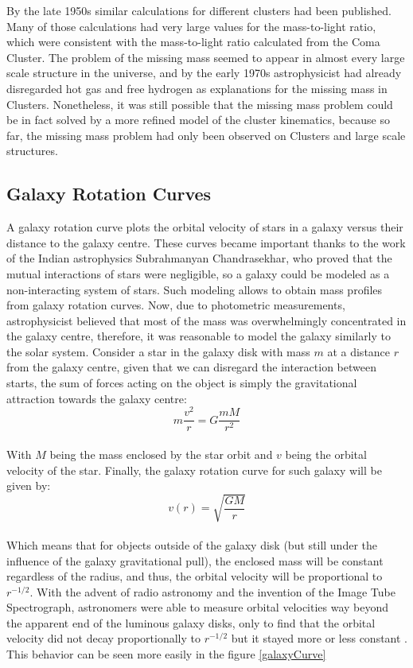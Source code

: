 By the late 1950s similar calculations for different clusters had been published. Many of those calculations had very large values for the mass-to-light ratio\cite{schwarzschildSon}, which were consistent with the mass-to-light ratio calculated from the Coma Cluster. The problem of the missing mass seemed to appear in almost every large scale structure in the universe, and by the early 1970s astrophysicist had already disregarded hot gas\cite{meekins} and free hydrogen\cite{penzias} as explanations for the missing mass in Clusters. Nonetheless, it was still possible that the missing mass problem could be in fact solved by a more refined model of the cluster kinematics, because so far, the missing mass problem had only been observed on Clusters and large scale structures.

\subsection{Galaxy Rotation Curves}
A galaxy rotation curve plots the orbital velocity of stars in a galaxy versus their distance to the galaxy centre. These curves became important thanks to the work of the Indian astrophysics Subrahmanyan Chandrasekhar, who proved that the mutual interactions of stars were negligible, so a galaxy could be modeled as a non-interacting system of stars. Such modeling allows to obtain mass profiles from galaxy rotation curves. Now, due to photometric measurements, astrophysicist believed that most of the mass was overwhelmingly concentrated  in the galaxy centre, therefore, it was reasonable to model the galaxy similarly to the solar system. Consider a star in the galaxy disk with mass $m$ at a distance $r$ from the galaxy centre, given that we can disregard the interaction between starts, the sum of forces acting on the object is simply the gravitational attraction towards the galaxy centre:\\
\begin{equation}
m\frac{v^2}{r} = G \frac{mM}{r^2}
\end{equation}\\
With $M$ being the mass enclosed by the star orbit and $v$ being the orbital velocity of the star. Finally, the galaxy rotation curve for such galaxy will be given by:\\
\begin{equation}
v(r) = \sqrt{\frac{GM}{r}}
\end{equation}\\
Which means that for objects outside of the galaxy disk (but still under the influence of the galaxy gravitational pull), the enclosed mass will be constant regardless of the radius, and thus, the orbital velocity will be proportional to $r^{-1/2}$. With the advent of radio astronomy and the invention of the Image Tube Spectrograph, astronomers were able to measure orbital velocities way beyond the apparent end of the luminous galaxy disks, only to find that the orbital velocity did not decay proportionally to $r^{-1/2}$ but it stayed more or less constant\cite{h21Line} \cite{galactoDistance} \cite{veraFirst}. This behavior can be seen more easily in the figure \ref{galaxyCurve}


